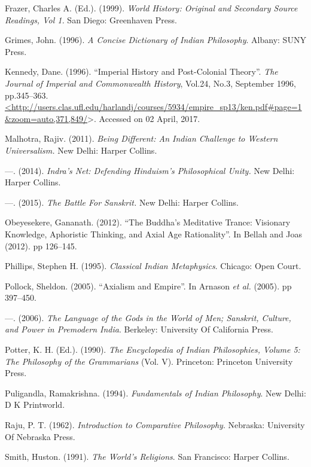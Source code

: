 \begin{thebibliography}{99}
  Frazer, Charles A. (Ed.). (1999). \textit{World History: Original and Secondary Source Readings, Vol 1.} San Diego: Greenhaven Press.

  Grimes, John. (1996). \textit{A Concise Dictionary of Indian Philosophy}. Albany: SUNY Press.

  Kennedy, Dane. (1996). “Imperial History and Post-Colonial Theory”. \textit{The Journal of Imperial and Commonwealth History}, Vol.24, No.3, September 1996, pp.345--363. \url{<http://users.clas.ufl.edu/harlandj/courses/5934/empire_sp13/ken.pdf#page=1&zoom=auto,371,849/}\textgreater . Accessed on 02 April, 2017.

  Malhotra, Rajiv. (2011). \textit{Being Different: An Indian Challenge to Western Universalism.} New Delhi: Harper Collins.

  —. (2014).\textit{ Indra's Net: Defending Hinduism's Philosophical Unity.} New Delhi: Harper Collins.

  —. (2015). \textit{The Battle For Sanskrit.} New Delhi: Harper Collins.

  Obeyesekere, Gananath. (2012). “The Buddha’s Meditative Trance: Visionary Knowledge, Aphoristic Thinking, and Axial Age Rationality”. In Bellah and Joas (2012). pp 126--145.

  Phillips, Stephen H. (1995). \textit{Classical Indian Metaphysics}. Chicago: Open Court.

  Pollock, Sheldon. (2005). “Axialism and Empire”. In Arnason \textit{et al.} (2005). pp 397--450.

  —. (2006). \textit{The Language of the Gods in the World of Men; Sanskrit, Culture, and Power in Premodern India}. Berkeley: University Of California Press.

  Potter, K. H. (Ed.). (1990). \textit{The Encyclopedia of Indian Philosophies, Volume 5: The Philosophy of the Grammarians} (Vol. V). Princeton: Princeton University Press.

  Puligandla, Ramakrishna. (1994). \textit{Fundamentals of Indian Philosophy}. New Delhi: D K Printworld.

  Raju, P. T. (1962). \textit{Introduction to Comparative Philosophy}. Nebraska: University Of Nebraska Press.

  Smith, Huston. (1991). \textit{The World’s Religions}. San Francisco: Harper Collins.


\end{thebibliography}

